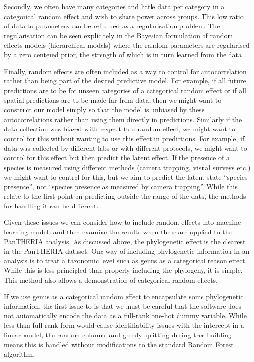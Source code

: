 \documentclass[10pt,]{article}
\begin{document}
Secondly, we often have many categories and little data per category in a categorical random effect and wish to share power across groups.
This low ratio of data to parameters can be reframed as a regularisation problem.
The regularisation can be seen explicitely in the Bayesian formulation of random effects models (hierarchical models) where the random parameters are regularised by a zero centered prior, the strength of which is in turn learned from the data \citep{simpson2017penalising}.

Finally, random effects are often included as a way to control for autocorrelation rather than being part of the desired predictive model.
For example, if all future predictions are to be for unseen categories of a categorical random effect or if all spatial predictions are to be made far from data, then we might want to construct our model simply so that the model is unbiased by these autocorrelations rather than using them directly in predictions.
Similarly if the data collection was biased with respect to a random effect, we might want to control for this without wanting to use this effect in predictions.
For example, if data was collected by different labs or with different protocols, we might want to control for this effect but then predict the latent effect.
If the presence of a species is measured using different methods (camera trapping, visual surveys etc.) we might want to control for this, but we aim to predict the latent state ``species presence'', not ``species presence as measured by camera trapping''.
While this relate to the first point on predicting outside the range of the data, the methods for handling it can be different.

Given these issues we can consider how to include random effects into machine learning models and then examine the results when these are applied to the PanTHERIA analysis.
As discussed above, the phylogenetic effect is the clearest in the PanTHERIA dataset.
One way of including phylogenetic information in an analysis is to treat a taxonomic level such as genus as a categorical reason effect.
While this is less principled than properly including the phylogeny, it is simple.
This method also allows a demonstration of categorical random effects.

If we use genus as a categorical random effect to encapsulate some phylogenetic information, the first issue to is that we must be careful that the software does not automatically encode the data as a full-rank one-hot dummy variable.
While less-than-full-rank form would cause identifiability issues with the intercept in a linear model, the random columns and greedy splitting during tree building means this is handled without modifications to the standard Random Forest algorithm.
\end{document}
